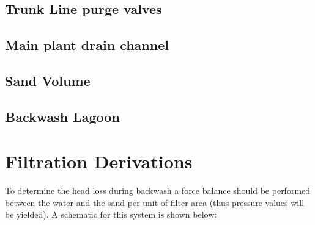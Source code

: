 \documentclass[letterpaper,10pt,english]{sphinxmanual}
\begin{document}
\section{Trunk Line purge valves}
\label{\detokenize{Filtration/Filtration_Design:trunk-line-purge-valves}}

\section{Main plant drain channel}
\label{\detokenize{Filtration/Filtration_Design:main-plant-drain-channel}}

\section{Sand Volume}
\label{\detokenize{Filtration/Filtration_Design:sand-volume}}

\section{Backwash Lagoon}
\label{\detokenize{Filtration/Filtration_Design:backwash-lagoon}}

\chapter{Filtration Derivations}
\label{\detokenize{Filtration/Filtration_Derivations:filtration-derivations}}\label{\detokenize{Filtration/Filtration_Derivations:title-filtration-derivations}}\label{\detokenize{Filtration/Filtration_Derivations::doc}}\label{\detokenize{Filtration/Filtration_Derivations:derivation-backwash-headloss-force-balance}}
To determine the head loss during backwash a force balance should be performed between the water and the sand per unit of filter area (thus pressure values will be yielded). A schematic for this system is shown below:

\begin{figure}[htbp]
\centering

\noindent{}
\label{\detokenize{Filtration/Filtration_Derivations:figure-force-balance}}\end{figure}
\end{document}
